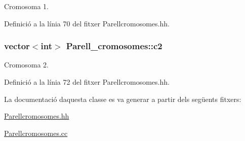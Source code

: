 Cromosoma 1. 



Definició a la línia 70 del fitxer Parellcromosomes.\+hh.

\subsubsection[{\texorpdfstring{c2}{c2}}]{\setlength{\rightskip}{0pt plus 5cm}vector$<$int$>$ Parell\+\_\+cromosomes\+::c2\hspace{0.3cm}{\ttfamily [private]}}\hypertarget{class_parell__cromosomes_a6e3169a9ca8b8d508ce1c0143a5b4a82}{}\label{class_parell__cromosomes_a6e3169a9ca8b8d508ce1c0143a5b4a82}


Cromosoma 2. 



Definició a la línia 72 del fitxer Parellcromosomes.\+hh.



La documentació d\textquotesingle{}aquesta classe es va generar a partir dels següents fitxers\+:\begin{DoxyCompactItemize}
\item 
\hyperlink{_parellcromosomes_8hh}{Parellcromosomes.\+hh}\item 
\hyperlink{_parellcromosomes_8cc}{Parellcromosomes.\+cc}\end{DoxyCompactItemize}
